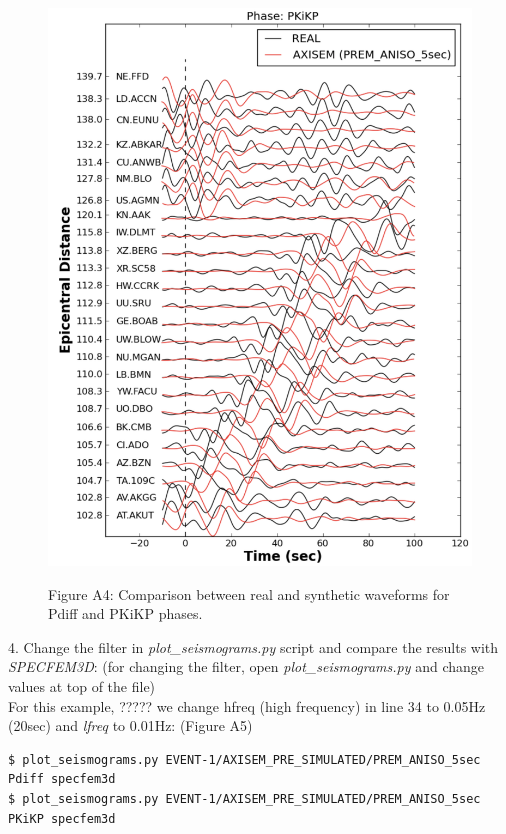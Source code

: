 \documentclass{article}
\begin{document}
\begin{figure}
\begin{minipage}{.5\textwidth}
  \includegraphics[width=1.\linewidth]{AXISEMTutorial-fig009.pdf}
\end{minipage}
\begin{center}
{\small{}Figure A4: Comparison between real and synthetic waveforms for Pdiff and 
PKiKP phases.}
\end{center}
\end{figure}


4. Change the filter in \textit{plot\_seismograms.py} script and compare the results with 
\textit{SPECFEM3D}: (for changing the filter, open \textit{plot\_seismograms.py} and change 
values at top of the file) \\
For this example, ????? we change hfreq (high frequency) in line 34 to 0.05Hz (20sec) and \textit{lfreq }to 0.01Hz: (Figure 
A5)

\begin{verbatim}
$ plot_seismograms.py EVENT-1/AXISEM_PRE_SIMULATED/PREM_ANISO_5sec Pdiff specfem3d
$ plot_seismograms.py EVENT-1/AXISEM_PRE_SIMULATED/PREM_ANISO_5sec PKiKP specfem3d
\end{verbatim}
\end{document}
